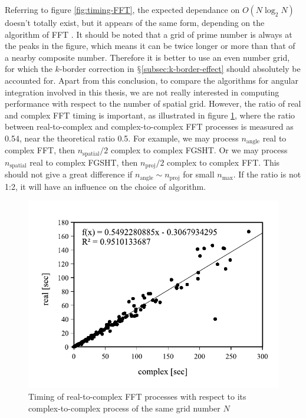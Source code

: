 Referring to figure \ref{fig:timing-FFT}, the expected dependance
on $O(N\log_{2}N)$ \citep{Numerical_Recipes_3ed} doesn't totally
exist, but it appears of the same form, depending on the algorithm
of \acs{FFT} \citep{Briggs-DFT}. It should be noted that a grid
of prime number is always at the peaks in the figure, which means
it can be twice longer or more than that of a nearby composite number.
Therefore it is better to use an even number grid, for which the $k$-border
correction in $\mathsection$\ref{subsec:k-border-effect} should
absolutely be accounted for. Apart from this conclusion, to compare
the algorithms for angular integration involved in this thesis, we
are not really interested in computing performance with respect to
the number of spatial grid. However, the ratio of real and complex
\acs{FFT} timing is important, as illustrated in figure \ref{fig:fft-real-to-complex},
where the ratio between real-to-complex and complex-to-complex \acs{FFT}
processes is measured as 0.54, near the theoretical ratio 0.5. For
example, we may process $n_{\mathrm{angle}}$ real to complex \acs{FFT},
then $n_{\mathrm{spatial}}/2$ complex to complex \acs{FGSHT}. Or
we may process $n_{\mathrm{spatial}}$ real to complex \acs{FGSHT},
then $n_{\mathrm{proj}}/2$ complex to complex \acs{FFT}. This should
not give a great difference if $n_{\mathrm{angle}}\sim n_{\mathrm{proj}}$
for small $n_{\max}$. If the ratio is not 1:2, it will have an influence
on the choice of algorithm.
\begin{center}
\begin{figure}[h]
\begin{centering}
\includegraphics[bb=0bp 20bp 340bp 235bp,width=0.55\columnwidth]{_figure/results/fftw_real_v_cmplx}
\par\end{centering}
\caption{Timing of real-to-complex \acs{FFT} processes with respect to its
complex-to-complex process of the same grid number $N$\label{fig:fft-real-to-complex}}
\end{figure}
\par\end{center}

